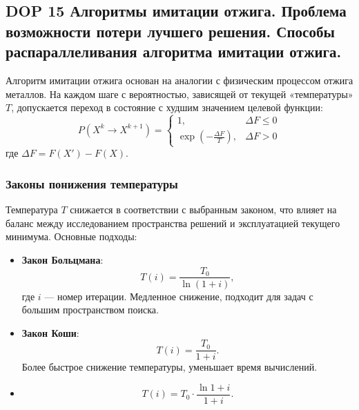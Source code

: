 \subsection*{DOP 15 Алгоритмы имитации отжига.
Проблема возможности потери лучшего решения.
Способы распараллеливания алгоритма имитации отжига.}

Алгоритм имитации отжига основан на аналогии с физическим процессом отжига металлов. На каждом шаге с вероятностью, зависящей от текущей «температуры» $T$, допускается переход в состояние с худшим значением целевой функции:
\[
P(X^k \to X^{k+1}) =
\begin{cases}
1, & \Delta F \leq 0 \\
\exp\left(-\frac{\Delta F}{T}\right), & \Delta F > 0
\end{cases}
\]
где $\Delta F = F(X') - F(X)$.

\subsubsection*{Законы понижения температуры}
Температура $T$ снижается в соответствии с выбранным законом, что влияет на баланс между исследованием пространства решений и эксплуатацией текущего минимума. Основные подходы:
\begin{itemize}
    \item \textbf{Закон Больцмана}:
    \[
    T(i) = \frac{T_0}{\ln(1+i)},
    \]
    где $i$ — номер итерации. Медленное снижение, подходит для задач с большим пространством поиска.

    \item \textbf{Закон Коши}:
    \[
    T(i) = \frac{T_0}{1+i}.
    \]
    Более быстрое снижение температуры, уменьшает время вычислений.

    \item
	\[
		T(i) = T_0\cdot\frac{\ln{1+i}}{1+i}.
    \]

    \end{itemize}


